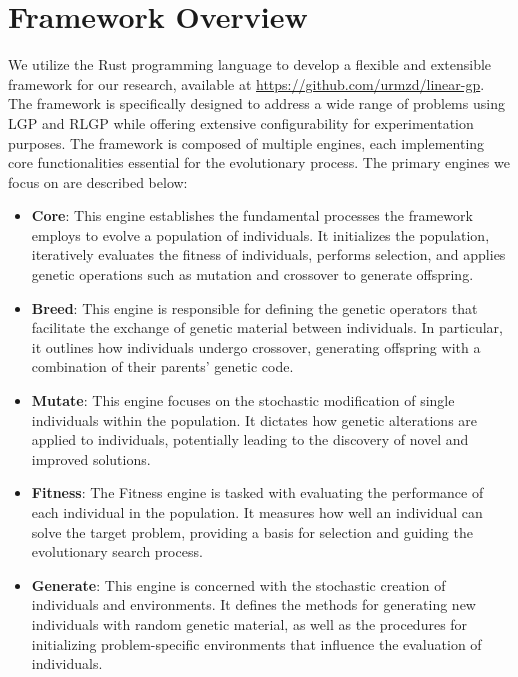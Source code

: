 \documentclass[12pt, final]{dalcsthesis}
\begin{document}
\section{Framework Overview}
We utilize the Rust programming language to develop a flexible and extensible framework for our research, available at \url{https://github.com/urmzd/linear-gp}. The framework is specifically designed to address a wide range of problems using LGP and RLGP while offering extensive configurability for experimentation purposes. The framework is composed of multiple engines, each implementing core functionalities essential for the evolutionary process. The primary engines we focus on are described below:

\begin{itemize}
    \item \textbf{Core}: This engine establishes the fundamental processes the framework employs to evolve a population of individuals. It initializes the population, iteratively evaluates the fitness of individuals, performs selection, and applies genetic operations such as mutation and crossover to generate offspring.

    \item \textbf{Breed}: This engine is responsible for defining the genetic operators that facilitate the exchange of genetic material between individuals. In particular, it outlines how individuals undergo crossover, generating offspring with a combination of their parents' genetic code.

    \item \textbf{Mutate}: This engine focuses on the stochastic modification of single individuals within the population. It dictates how genetic alterations are applied to individuals, potentially leading to the discovery of novel and improved solutions.

    \item \textbf{Fitness}: The Fitness engine is tasked with evaluating the performance of each individual in the population. It measures how well an individual can solve the target problem, providing a basis for selection and guiding the evolutionary search process.

    \item \textbf{Generate}: This engine is concerned with the stochastic creation of individuals and environments. It defines the methods for generating new individuals with random genetic material, as well as the procedures for initializing problem-specific environments that influence the evaluation of individuals.
\end{itemize}
\end{document}
